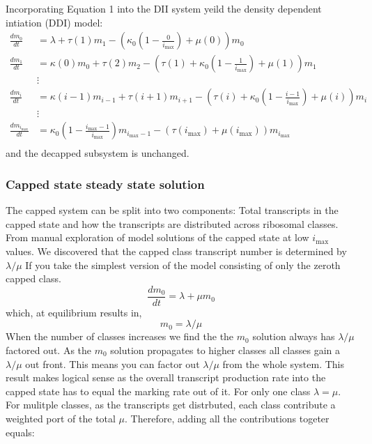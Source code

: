 \documentclass[review]{elsarticle}
\newcommand{\imax}{\ensuremath{i_{\max}}\xspace}
\begin{document}
Incorporating Equation 1 into the DII system yeild the density dependent intiation (DDI) model: %
\begin{align*}
\frac{dm_{0}}{dt} &= \lambda+\tau(1)m_{1}-\left(\kappa_0\left(1-\frac{0}{\imax}\right) + \mu(0)\right)m_{0} \\
\frac{dm_{1}}{dt} &= \kappa(0)m_{0}+\tau(2)m_{2}-\left(\tau(1)+\kappa_0\left(1-\frac{1}{\imax}\right)+\mu(1)\right) m_{1}\\
& \vdots & \\
\frac{dm_{i}}{dt} &= \kappa(i-1)m_{i-1}+\tau(i+1)m_{i+1}-\left(\tau(i)+\kappa_0\left(1-\frac{i-1}{\imax}\right)+\mu(i)\right) m_{i} \\
& \vdots & \\
\frac{dm_{\imax}}{dt} &= \kappa_0\left(1-\frac{\imax-1}{\imax}\right)m_{\imax-1}-\left(\tau(\imax)+\mu(\imax)\right) m_{\imax}\\
\end{align*}
and the decapped subsystem is unchanged.


\subsubsection{Capped state steady state solution}

The capped system can be split into two components: Total transcripts in the capped state and how the transcripts are distributed across ribosomal classes. 
From manual exploration of model solutions of the capped state at low \imax values. 
We discovered that the capped class transcript number is determined by $\lambda/ \mu$
If you take the simplest version of the model consisting of only the zeroth capped class.
	\begin{equation} \label{eq:basic_capped_solution1}
		\frac{dm_{0}}{dt} = \lambda + \mu m_{0}
	\end{equation}
which, at equilibrium results in,
	\begin{equation}\label{eq:basic_capped_solution2}
		m_{0} = \lambda/\mu
	\end{equation}
When the number of classes increases we find the the $m_{0}$ solution always has $\lambda/ \mu$ factored out. As the $m_{0}$ solution propagates to higher classes all classes gain a $\lambda/ \mu$ out front.
This means you can factor out $\lambda/ \mu$ from the whole system. 
This result makes logical sense as the overall transcript production rate into the capped state has to equal the marking rate out of it. For only one class $\lambda = \mu$. 
For mulitple classes, as the transcripts get distrbuted, each class contribute a weighted port of the total $\mu$. Therefore, adding all the contributions togeter equals:
\end{document}
